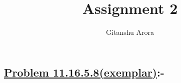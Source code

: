 \documentclass[journal,12pt,twocolumn]{IEEEtran}
\begin{document}
\newtheorem{theorem}{Theorem}[section]
\newtheorem{problem}{Problem}
\newtheorem{proposition}{Proposition}[section]
\newtheorem{lemma}{Lemma}[section]
\newtheorem{corollary}[theorem]{Corollary}
\newtheorem{example}{Example}[section]
\newtheorem{definition}[problem]{Definition}
\newcommand{\BEQA}{\begin{eqnarray}}
\newcommand{\EEQA}{\end{eqnarray}}
\newcommand{\define}{\stackrel{\triangle}{=}}



\providecommand{\mbf}{\mathbf}
\providecommand{\pr}[1]{\ensuremath{\Pr\left(#1\right)}}
\providecommand{\qfunc}[1]{\ensuremath{Q\left(#1\right)}}
\providecommand{\sbrak}[1]{\ensuremath{{}\left[#1\right]}}
\providecommand{\lsbrak}[1]{\ensuremath{{}\left[#1\right.}}
\providecommand{\rsbrak}[1]{\ensuremath{{}\left.#1\right]}}
\providecommand{\brak}[1]{\ensuremath{\left(#1\right)}}
\providecommand{\lbrak}[1]{\ensuremath{\left(#1\right.}}
\providecommand{\rbrak}[1]{\ensuremath{\left.#1\right)}}
\providecommand{\cbrak}[1]{\ensuremath{\left\{#1\right\}}}
\providecommand{\lcbrak}[1]{\ensuremath{\left\{#1\right.}}
\providecommand{\rcbrak}[1]{\ensuremath{\left.#1\right\}}}
\theoremstyle{remark}
\newtheorem{rem}{Remark}
\newcommand{\sgn}{\mathop{\mathrm{sgn}}}

\newcommand{\solution}{ \textbf{Solution: }}
\newcommand{\cosec}{\,\text{cosec}\,}
\providecommand{\dec}[2]{\ensuremath{\overset{#1}{\underset{#2}{\gtrless}}}}
\newcommand{\myvec}[1]{\ensuremath{\begin{pmatrix}#1\end{pmatrix}}}
\newcommand{\mydet}[1]{\ensuremath{\begin{vmatrix}#1\end{vmatrix}}}

\let\vec\mathbf


\vspace{3cm}

\title{
Assignment 2
}
\author{ Gitanshu Arora %
}
\maketitle
\newpage
\bigskip
\renewcommand{\thefigure}{\theenumi}
\renewcommand{\thetable}{\theenumi}

\subsection*{\textbf{\underline{Problem 11.16.5.8(exemplar)}:-}}
\end{document}

